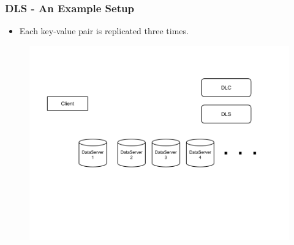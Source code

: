 \documentclass{beamer}
\begin{document}
\begin{frame}
  \frametitle{DLS - An Example Setup}
  \begin{itemize}
  \item Each key-value pair is replicated three times.
    \newline

  \end{itemize}
  \begin{figure}
    \begin{center}
      \centerline{\includegraphics[scale=0.40]{img/DLS_Example1.png}}
    \end{center}
  \end{figure}

\end{frame}
\end{document}
